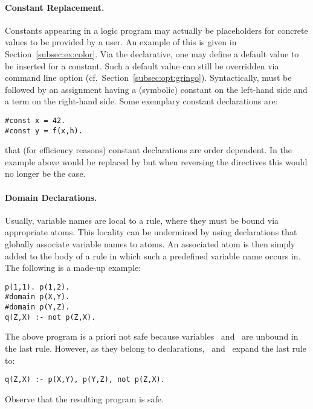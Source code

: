 \paragraph{Constant Replacement.}
%
Constants appearing in a logic program may actually be placeholders for
concrete values to be provided by a user.
An example of this is given in Section~\ref{subsec:ex:color}.
Via the  declarative,
one may define a default value to be inserted for a constant.
Such a default value can still be overridden via command line option
 (cf.\ Section~\ref{subsec:opt:gringo}).
Syntactically,  must be followed by an assignment having
a (symbolic) constant on the left-hand side and a term on the right-hand side.
Some exemplary constant declarations are:
%
\begin{lstlisting}[numbers=none]
#const x = 42.
#const y = f(x,h).
\end{lstlisting}

\begin{Note}
that (for efficiency reasons) constant declarations are order dependent.
In the example above  would be replaced by 
but when reversing the directives this would no longer be the case.
\end{Note}

\paragraph{Domain Declarations.}
%
Usually, variable names are local to a rule,
where they must be bound via appropriate atoms.
This locality can be undermined by using
 declarations 
that globally associate variable names to atoms.
An associated atom is then simply added to the body of a rule in which
such a predefined variable name occurs in.
The following is a made-up example:
%
\begin{lstlisting}[numbers=none]
p(1,1). p(1,2).
#domain p(X,Y).
#domain p(Y,Z).
q(Z,X) :- not p(Z,X).
\end{lstlisting}
%
The above program is a priori not safe because
variables~ and~ are unbound in the last rule.
However, as they belong to  declarations,
\gringo\ and \clingo\ expand the last rule to:
%
\begin{lstlisting}[numbers=none]
q(Z,X) :- p(X,Y), p(Y,Z), not p(Z,X).
\end{lstlisting}
%
Observe that the resulting program is safe.

